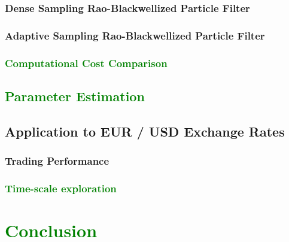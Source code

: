 \documentclass[12pt]{article}
\newcommand{\tofix}[1]{
    \textcolor{green}{#1}
}
\begin{document}
    	\subsubsection{Dense Sampling Rao-Blackwellized Particle Filter} \label{sec:dense_sampling_rbpf}
    	
    	\subsubsection{Adaptive Sampling Rao-Blackwellized Particle Filter} \label{sec:adaptive_sampling_rbpf}
    	
    	\subsubsection{\tofix{Computational Cost Comparison}}
    	
    	
    
    \subsection{\tofix{Parameter Estimation}}
    

    
    \subsection{Application to EUR / USD Exchange Rates}
    	
    	\subsubsection{Trading Performance}
    	
    	\subsubsection{\tofix{Time-scale exploration}}
    
    
\section{ \tofix{Conclusion} }

\end{document}
